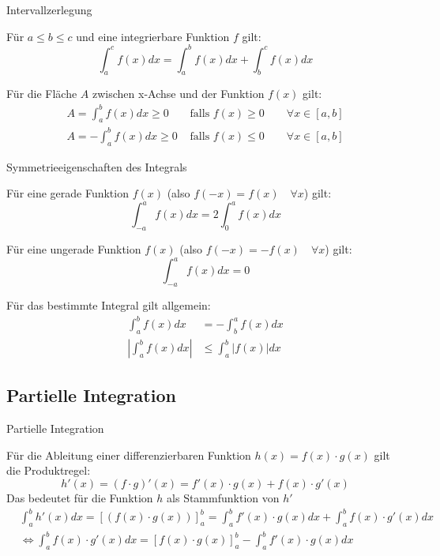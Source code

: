 \begin{frame}{Intervallzerlegung}
	\begin{bemerkung}
		Für $a \leq b \leq c$ und eine integrierbare Funktion $f$ gilt:
		\[
			\int_{a}^{c} f(x) dx = \int_{a}^{b} f(x) dx + \int_{b}^{c} f(x) dx
		\]
		
		Für die Fläche $A$ zwischen x-Achse und der Funktion $f(x)$ gilt:
		\begin{align*}
			A = \int_{a}^{b} f(x) dx \geq 0 & \text{ falls } f(x) \geq 0 \qquad\forall x\in [a, b] \\
			A = - \int_{a}^{b} f(x) dx \geq 0 & \text{ falls } f(x) \leq 0 \qquad \forall x\in [a, b]
		\end{align*}
	\end{bemerkung}
\end{frame}

\begin{frame}{Symmetrieeigenschaften des Integrals}
	\begin{bemerkung}
		Für eine gerade Funktion $f(x)$ (also $f(-x) = f(x) \quad \forall x$) gilt:
		\[
			\int_{-a}^{a} f(x) dx = 2 \int_{0}^{a} f(x) dx
		\]

		Für eine ungerade Funktion $f(x)$ (also $f(-x) = -f(x) \quad \forall x$) gilt:
		\[
			\int_{-a}^{a} f(x) dx = 0
		\]
		
		Für das bestimmte Integral gilt allgemein:
		\begin{align*}
			\int_{a}^{b} f(x) dx & = - \int_{b}^{a} f(x) dx \\
			\left| \int_{a}^{b} f(x) dx \right| & \leq \int_{a}^{b} | f(x) | dx
		\end{align*}

	\end{bemerkung}
\end{frame}

\subsection{Partielle Integration}

\begin{frame}{Partielle Integration}
\begin{bemerkung}
	Für die Ableitung einer differenzierbaren Funktion $h(x)=f(x)\cdot g(x)$ gilt die Produktregel:
	\[
		h'(x) = (f\cdot g)'(x) = f'(x)\cdot g(x) + f(x) \cdot g'(x) 
	\]
	Das bedeutet für die Funktion $h$ als Stammfunktion von $h'$ 
	\small{\begin{align*}
		& \int_{a}^{b} h'(x) dx = \left[ (f(x) \cdot g(x)) \right]_{a}^{b} = \int_{a}^{b} f'(x) \cdot g(x) dx + \int_{a}^{b} f(x)\cdot g'(x) dx \\
		& \Leftrightarrow \int_{a}^{b} f(x)\cdot g'(x) dx = [f(x)\cdot g(x)]_{a}^{b} - \int_{a}^{b} f'(x)\cdot g(x) dx
 	\end{align*}}
\end{bemerkung}
\end{frame}

